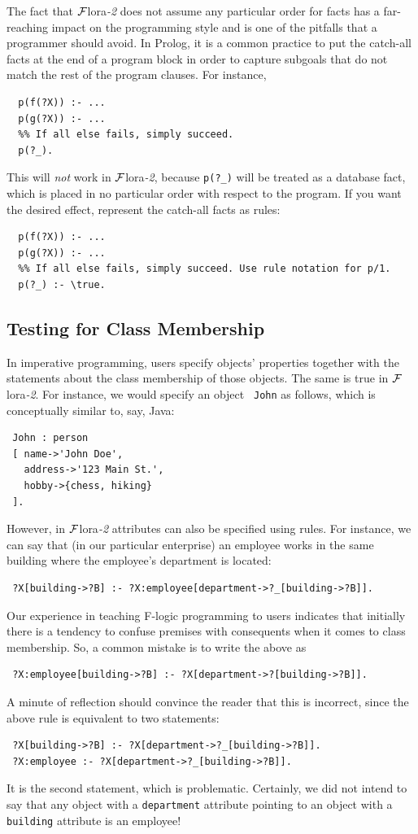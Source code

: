 \documentclass[11pt]{article}
\newcommand{\FLSYSTEM}{{\mbox{\sc ${\cal F}${lora}\rm\emph{-2}}}\xspace}
\begin{document}
The fact that \FLSYSTEM does not assume any particular order for facts has a
far-reaching impact on the programming style and is one of the
pitfalls that a programmer should avoid.  In Prolog, it is a
common practice to put the catch-all facts at the end of a program block in
order to capture subgoals that do not match the rest of the program
clauses. For instance,
\begin{verbatim}
  p(f(?X)) :- ...
  p(g(?X)) :- ...
  %% If all else fails, simply succeed.
  p(?_).
\end{verbatim}
This will \emph{not} work in \FLSYSTEM, because {\tt p(?\_)} will be treated as a
database fact, which is placed in no particular order with respect to the
program. If you want the desired effect, represent the catch-all facts as
rules: 
\begin{verbatim}
  p(f(?X)) :- ...
  p(g(?X)) :- ...
  %% If all else fails, simply succeed. Use rule notation for p/1.
  p(?_) :- \true.
\end{verbatim}

\subsection{Testing for Class Membership}

In imperative programming, users specify objects' properties together with
the statements about the class membership of those objects.
The same is true in \FLSYSTEM. For instance, we would specify an object {\tt
  John} as follows, which is conceptually similar to, say, Java:
\begin{verbatim}
 John : person
 [ name->'John Doe',
   address->'123 Main St.',
   hobby->{chess, hiking}
 ].
\end{verbatim}
However, in \FLSYSTEM attributes can also be specified using rules. For
instance, we can say that (in our particular enterprise)
an employee works in the same building where the employee's department is
located:
\begin{verbatim}
 ?X[building->?B] :- ?X:employee[department->?_[building->?B]].  
\end{verbatim}
Our experience in teaching F-logic programming to users indicates that
initially there is a tendency to confuse premises with consequents when it
comes to class membership. So, a common mistake is to write the above as
\begin{verbatim}
 ?X:employee[building->?B] :- ?X[department->?[building->?B]].  
\end{verbatim}
A minute of reflection should convince the reader that this is incorrect, since
the above rule is equivalent to two statements:
\begin{verbatim}
 ?X[building->?B] :- ?X[department->?_[building->?B]].  
 ?X:employee :- ?X[department->?_[building->?B]].
\end{verbatim}
It is the second statement, which is problematic. Certainly, we did not
intend to say that any object with a {\tt department} attribute pointing to
an object with a {\tt building} attribute is an employee!
\end{document}
